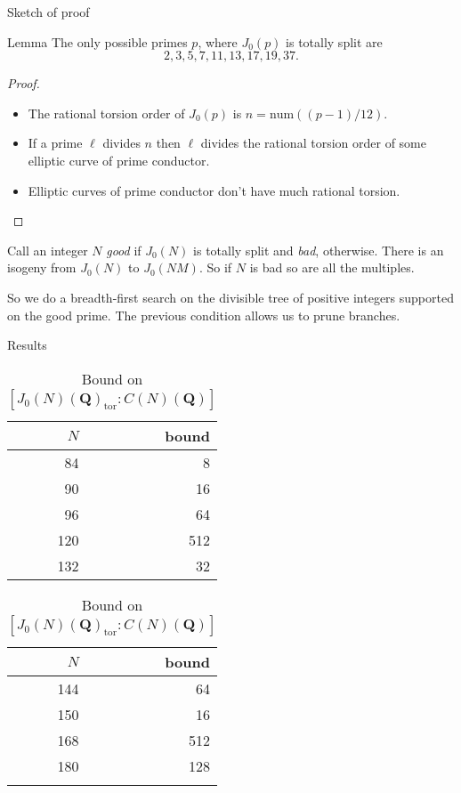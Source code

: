 \documentclass{beamer}
\newcommand{\QQ}{\mathbf{Q}}
\newcommand{\tor}{\mathrm{tor}}
\newcommand{\num}{\mathrm{num}}
\begin{document}
\begin{frame}{Sketch of proof}
    \begin{block}{Lemma}
    The only possible primes $p$, where $J_0(p)$ is totally split are
    \[
        2, 3, 5, 7, 11, 13, 17, 19, 37.
    \]
    \end{block}
    \begin{proof}
        \begin{itemize}
            \item 
                The rational torsion order of $J_0(p)$ is $n=\num((p-1)/12)$.
            \item
                If a prime $\ell$ divides $n$ then $\ell$ divides the rational
                torsion order of some elliptic curve of prime conductor.
            \item
                Elliptic curves of prime conductor don't have much rational
                torsion.
        \end{itemize}
   \end{proof}
    Call an integer $N$ \emph{good} if $J_0(N)$ is totally split and
    \emph{bad}, otherwise. There is an isogeny from $J_0(N)$ to $J_0(NM)$. So
    if $N$ is bad so are all the multiples.

    So we do a breadth-first search on the divisible tree of positive integers
    supported on the good prime. The previous condition allows us to prune
    branches.
\end{frame}

\begin{frame}{Results}
\begin{table}%
    \label{tab:rank_zero_bound}
    \caption{Bound on $[J_0(N)(\QQ)_\tor:C(N)(\QQ)]$}
    \centering
    \begin{tabular}{rr}
        \toprule
        $N$ & bound \\
        \midrule
        84 & 8 \\
        90 & 16 \\
        96 & 64 \\
        120 & 512 \\
        132 & 32 \\
        \bottomrule
    \end{tabular}
    \begin{tabular}{rr}
        \toprule
        $N$ & bound \\
        \midrule
        144 & 64 \\
        150 & 16 \\
        168 & 512 \\
        180 & 128  \\
            &  \\
        \bottomrule
    \end{tabular}
\end{table}
\end{frame}
\end{document}
